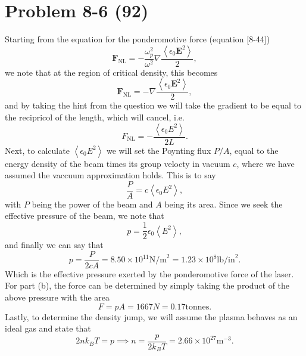 \section*{Problem 8-6 (92)}
\label{sec:8-6}
Starting from the equation for the ponderomotive force (equation [8-44])
\begin{equation*}
	\bm{F}_{\text{NL}} = -\dfrac{\omega_p^2}{\omega^2}\nabla\dfrac{\left<\epsilon_0\bm{E}^2\right>}{2},
\end{equation*}
we note that at the region of critical density, this becomes
\begin{equation*}
	\bm{F}_{\text{NL}} = -\nabla\dfrac{\left<\epsilon_0\bm{E}^2\right>}{2},
\end{equation*}
and by taking the hint from the question we will take the gradient to be equal to the recipricol of the length, which will cancel, i.e.
\begin{equation*}
	F_{\text{NL}} = -\dfrac{\left<\epsilon_0{E}^2\right>}{2L}.
\end{equation*}
Next, to calculate \( \left<\epsilon_0{E}^2\right> \) we will set the Poynting flux \(P/A\), equal to the energy density of the beam times its group velocty in vacuum \(c\), where we have assumed the vaccuum approximation holds. This is to say 
\begin{equation*}
	\dfrac{P}{A} = c\left<\epsilon_0{E}^2\right>, 
\end{equation*}
with \(P\) being the power of the beam and \(A\) being its area. Since we seek the effective pressure of the beam, we note that 
\begin{equation*}
	p = \dfrac{1}{2}\epsilon_0\left<E^2\right>,
\end{equation*}
and finally we can say that
\begin{equation*}
	p = \dfrac{P}{2cA} = 8.50\times 10^{11}\text{N/m}^2 = 1.23 \times 10^{8}\text{lb/in}^2.
\end{equation*}
Which is the effective pressure exerted by the ponderomotive force of the laser.
For part (b), the force can be determined by simply taking the product of the above pressure with the area
\begin{equation*}
	F = pA = 1667N = 0.17\text{tonnes}.
\end{equation*}
Lastly, to determine the density jump, we will assume the plasma behaves as an ideal gas and state that 
\begin{equation*}
	2nk_BT = p \implies n = \dfrac{p}{2k_BT} = 2.66\times 10^{27}\text{m}^{-3}.
\end{equation*}

